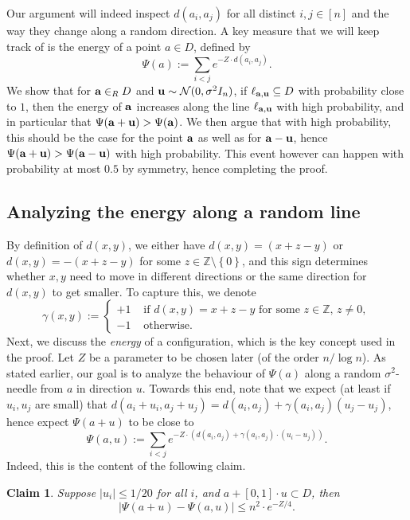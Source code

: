 \documentclass[10pt,a4paper]{article}
\newtheorem{claim}[thm]{Claim}
\newcommand\set[1]{{\left\{ #1 \right\}}}
\renewcommand\leq{\leqslant}
\newcommand{\ZZ}{\mathbb{Z}}
\newcommand{\ga}{\gamma}
\begin{document}
Our argument will indeed inspect $d(a_i,a_j)$ for all distinct $i,j\in[n]$ and the way they change along a random direction.
A key measure that we will keep track of is the energy of a point $a\in D$, defined by
\begin{equation*}
\Psi(a):= \sum_{i<j} e^{-Z \cdot d(a_i,a_j)}.
\end{equation*}
We show that for ${\bf a}\in_R D$ and ${\bf u}\sim \mathcal{N}(0,\sigma^2 I_n)$, if $\ell_{{\bf a}, {\bf u}}\subseteq D$ with
probability close to $1$, then the energy of ${\bf a}$ increases along the line $\ell_{{\bf a},{\bf u}}$ with high probability, and
in particular that $\Psi({\bf a}+{\bf u}) > \Psi({\bf a})$. We then argue that with high probability, this should be the case for
the point ${\bf a}$ as well as for ${\bf a} - {\bf u}$, hence $\Psi({\bf a}+{\bf u}) > \Psi({\bf a}-{\bf u})$ with high probability.
This event however can happen with probability at most $0.5$ by symmetry, hence completing the proof.


\subsection{Analyzing the energy along a random line}
By definition of $d(x,y)$, we either have $d(x,y) = (x+z-y)$ or $d(x,y) = -(x+z-y)$ for some $z\in\mathbb{Z}\setminus\set{0}$,
and this sign determines whether $x,y$ need to move in different directions or the same direction for $d(x,y)$ to get smaller.
To capture this, we denote
\[
\ga(x,y):=\left\{ \begin{array}{ll}
+1 & \text{ if $d(x,y)=x+z-y$ for some $z\in\ZZ$, $z\neq 0$},\\
-1 & \text{ otherwise}.	
\end{array} \right.
\]
Next, we discuss the {\em energy} of a configuration, which is the key concept used in the proof.
Let $Z$ be a parameter to be chosen later (of the order $n/\log n$).
As stated earlier, our goal is to analyze the behaviour of $\Psi(a)$ along a random $\sigma^2$-needle from $a$
in direction $u$. Towards this end, note that we expect (at least if $u_i, u_j$ are small) that $d(a_i+u_i, a_j+u_j) = d(a_i,a_j) + \ga(a_i,a_j) (u_j-u_j)$,
hence expect $\Psi(a+u)$ to be close to
\begin{equation*}
\Psi(a,u):=  \sum_{i<j} e^{-Z \cdot (d(a_i,a_j)+\ga(a_i,a_j)\cdot (u_i-u_j))}.
\end{equation*}
Indeed, this is the content of the following claim.

\begin{claim}
	\label{cl:1}
	Suppose $|u_i|\leq 1/20$ for all $i$, and $a+[0,1]\cdot u \subset D$, then
	$$
	|\Psi(a+u)-\Psi(a,u)|\leq n^2\cdot e^{-Z/4}.
	$$
\end{claim}
\end{document}
